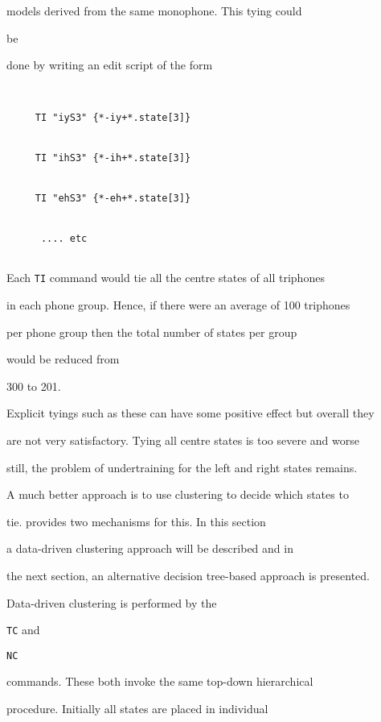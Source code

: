 models derived from the same monophone.  This tying could 


be


done by writing an edit script of the form


\begin{verbatim}


     TI "iyS3" {*-iy+*.state[3]}


     TI "ihS3" {*-ih+*.state[3]}


     TI "ehS3" {*-eh+*.state[3]}


      .... etc


\end{verbatim}


Each \texttt{TI} command would tie all the centre states of all triphones


in each phone group. Hence, if there were an average of 100 triphones


per phone group then the total number of states per group


would be reduced from


300 to 201.





Explicit tyings such as these can have some positive effect but overall they 


are not very satisfactory.  Tying all centre states is too severe and worse


still, the problem of undertraining for the left and right states remains.


A much better approach is to use clustering to decide which states to


tie.   provides two mechanisms for this.  In this section


a data-driven clustering approach will be described and in


the next section, an alternative decision tree-based approach is presented.





Data-driven clustering is performed by the 


\texttt{TC} and 


\texttt{NC}


commands.  These both invoke the same top-down hierarchical


procedure.  Initially all states are placed in individual


